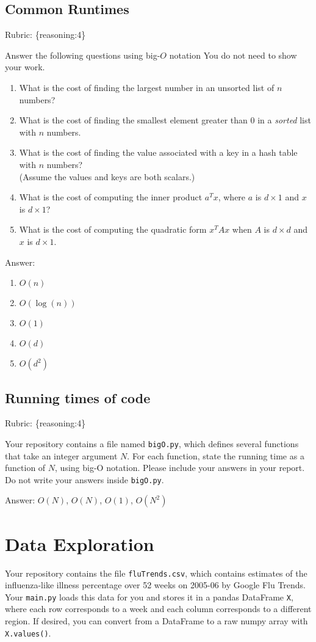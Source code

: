 \documentclass{article}
\def\rubric#1{\gre{Rubric: \{#1\}}}{}
\def\blu#1{{\color{blu}#1}}
\def\gre#1{{\color{gre}#1}}
\def\red#1{{\color{red}#1}}
\begin{document}
\subsection{Common Runtimes}
\rubric{reasoning:4}

\blu{Answer the following questions using big-$O$ notation} You do not need to show your work.
\begin{enumerate}
\item What is the cost of finding the largest number in an unsorted list of $n$ numbers?
\item What is the cost of finding the smallest element greater than 0 in a \emph{sorted} list with $n$ numbers.
\item What is the cost of finding the value associated with a key in a hash table with $n$ numbers? \\(Assume the values and keys are both scalars.)
\item What is the cost of computing the inner product $a^Tx$, where $a$ is $d \times 1$ and $x$ is $d \times 1$?
\item What is the cost of computing the quadratic form $x^TAx$ when $A$ is $d \times d$ and $x$ is $d \times 1$.
\end{enumerate}
\red{
Answer:
\begin{enumerate}
\item $O(n)$
\item $O(\log(n))$
\item $O(1)$
\item $O(d)$
\item $O(d^2)$
\end{enumerate}
}
\subsection{Running times of code}
\rubric{reasoning:4}

Your repository contains a file named \texttt{bigO.py}, which defines several functions
that take an integer argument $N$. For each function, \blu{state the running time as a function of $N$, using big-O notation}.
Please include your answers in your report. Do not write your answers inside \texttt{bigO.py}.

\red{
Answer:
$O(N)$, $O(N)$, $O(1)$, $O(N^2)$
}
\section{Data Exploration}


Your repository contains the file \texttt{fluTrends.csv}, which contains estimates
of the influenza-like illness percentage over 52 weeks on 2005-06 by Google Flu Trends.
Your \texttt{main.py} loads this data for you and stores it in a pandas DataFrame \texttt{X},
where each row corresponds to a week and each column
corresponds to a different
region. If desired, you can convert from a DataFrame to a raw numpy array with \texttt{X.values()}.
\end{document}
